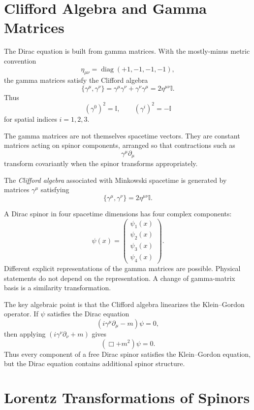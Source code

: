 \section{Clifford Algebra and Gamma Matrices}

The Dirac equation is built from gamma matrices. With the mostly-minus metric
convention
\[
    \eta_{\mu\nu}=\operatorname{diag}(+1,-1,-1,-1),
\]
the gamma matrices satisfy the Clifford algebra
\[
    \{\gamma^\mu,\gamma^\nu\}
    =\gamma^\mu\gamma^\nu+\gamma^\nu\gamma^\mu
    =2\eta^{\mu\nu}\mathbb{I}.
\]
Thus
\[
    (\gamma^0)^2=\mathbb{I},
    \qquad
    (\gamma^i)^2=-\mathbb{I}
\]
for spatial indices \(i=1,2,3\).

The gamma matrices are not themselves spacetime vectors. They are constant
matrices acting on spinor components, arranged so that contractions such as
\[
    \gamma^\mu\partial_\mu
\]
transform covariantly when the spinor transforms appropriately.

\begin{definitionbox}
The \emph{Clifford algebra} associated with Minkowski spacetime is generated by
matrices \(\gamma^\mu\) satisfying
\[
    \{\gamma^\mu,\gamma^\nu\}=2\eta^{\mu\nu}\mathbb{I}.
\]
\end{definitionbox}

A Dirac spinor in four spacetime dimensions has four complex components:
\[
    \psi(x)=
    \begin{pmatrix}
    \psi_1(x)\\
    \psi_2(x)\\
    \psi_3(x)\\
    \psi_4(x)
    \end{pmatrix}.
\]
Different explicit representations of the gamma matrices are possible. Physical
statements do not depend on the representation. A change of gamma-matrix basis
is a similarity transformation.

The key algebraic point is that the Clifford algebra linearizes the
Klein--Gordon operator. If \(\psi\) satisfies the Dirac equation
\[
    (i\gamma^\mu\partial_\mu-m)\psi=0,
\]
then applying \((i\gamma^\nu\partial_\nu+m)\) gives
\[
    (\Box+m^2)\psi=0.
\]
Thus every component of a free Dirac spinor satisfies the Klein--Gordon equation,
but the Dirac equation contains additional spinor structure.

\section{Lorentz Transformations of Spinors}

